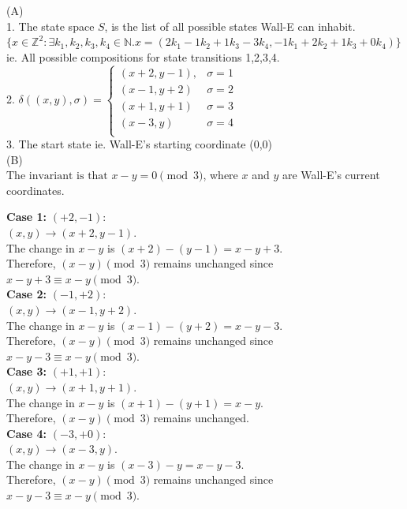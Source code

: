 \documentclass[solution,letterpaper]{cs20}
\begin{document}
\begin{problem}
        \begin{solution}
        (A) \\
        1. The state space $S$, is the list of all possible states Wall-E can inhabit. \\
        $\{x \in \mathbb{Z}^2: \exists k_1, k_2, k_3, k_4 \in \mathbb{N}. x = (2k_1 - 1k_2 + 1k_3 -3k_4, -1k_1 + 2k_2 + 1k_3 + 0k_4) \}$ \\
        ie. All possible compositions for state transitions 1,2,3,4. \\
        2. $\delta ((x, y), \sigma) =  \begin{cases}
        (x+2, y-1), & \sigma = 1 \\
        (x-1, y+2) & \sigma = 2 \\
        (x+1, y+1) & \sigma = 3 \\
        (x-3, y) & \sigma = 4 \\
        \end{cases} $ \\
        3. The start state ie. Wall-E's starting coordinate (0,0) \\

        (B) \\
        \( \text{The invariant is that } x - y = 0 \pmod{3} \), where \( x \) and \( y \) are Wall-E's current coordinates.

        \textbf{Case 1:} $(+2, -1)$: \\
        \((x, y) \to (x+2, y-1)\). \\
        The change in \( x - y \) is \((x + 2) - (y - 1) = x - y + 3\). \\
        Therefore, \( (x - y) \pmod{3} \) remains unchanged since \( x - y + 3 \equiv x - y \pmod{3} \). \\
        \textbf{Case 2:} $(-1, +2)$: \\
        \((x, y) \to (x-1, y+2)\). \\
        The change in \( x - y \) is \((x - 1) - (y + 2) = x - y - 3\). \\
        Therefore, \( (x - y) \pmod{3} \) remains unchanged since \( x - y - 3 \equiv x - y \pmod{3} \). \\
        \textbf{Case 3:} $(+1, +1)$: \\
        \((x, y) \to (x+1, y+1)\). \\
        The change in \( x - y \) is \((x + 1) - (y + 1) = x - y\). \\
        Therefore, \( (x - y) \pmod{3} \) remains unchanged. \\
        \textbf{Case 4:} $(-3, +0)$: \\
        \((x, y) \to (x-3, y)\). \\
        The change in \( x - y \) is \((x - 3) - y = x - y - 3\). \\
        Therefore, \( (x - y) \pmod{3} \) remains unchanged since \( x - y - 3 \equiv x - y \pmod{3} \). \\



\end{solution}
\end{problem}
\end{document}
